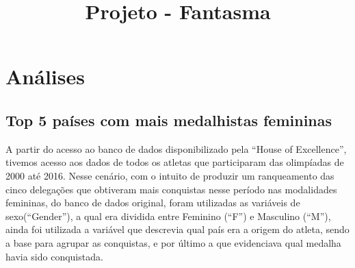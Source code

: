 \documentclass[
]{estat/estat}
\title{Projeto - Fantasma}
\author{}
\date{}
\renewcommand*\contentsname{Índice}
\newcommand\contentsname{Índice}
\begin{document}
\maketitle

\fancyhf{} 

\fancyhead[L]{} %
\renewcommand{\headrulewidth}{0pt}   %

\fancyfoot[R]{\textcolor{white}{\thepage}} %

\pagestyle{fancy} 

\renewcommand*\contentsname{Sumário}
{
\hypersetup{linkcolor=}
\setcounter{tocdepth}{3}
\tableofcontents
}

\section{Análises}\label{anuxe1lises}

\subsection{Top 5 países com mais medalhistas
femininas}\label{top-5-pauxedses-com-mais-medalhistas-femininas}

A partir do acesso ao banco de dados disponibilizado pela ``House of
Excellence'', tivemos acesso aos dados de todos os atletas que
participaram das olimpíadas de 2000 até 2016. Nesse cenário, com o
intuito de produzir um ranqueamento das cinco delegações que obtiveram
mais conquistas nesse período nas modalidades femininas, do banco de
dados original, foram utilizadas as variáveis de sexo(``Gender''), a
qual era dividida entre Feminino (``F'') e Masculino (``M''), ainda foi
utilizada a variável que descrevia qual país era a origem do atleta,
sendo a base para agrupar as conquistas, e por último a que evidenciava
qual medalha havia sido conquistada.
\end{document}
